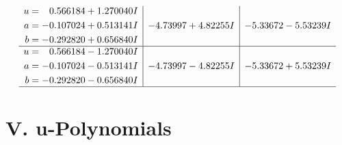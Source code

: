 \documentclass[1p]{elsarticle_modified}
\theoremstyle{definition}
\begin{document}
$$\begin{array}{c|c|c}
\begin{aligned}
u &= \phantom{-}0.566184 + 1.270040 I \\
a &= -0.107024 + 0.513141 I \\
b &= -0.292820 + 0.656840 I\end{aligned}
 & -4.73997 + 4.82255 I & -5.33672 - 5.53239 I \\ \hline\begin{aligned}
u &= \phantom{-}0.566184 - 1.270040 I \\
a &= -0.107024 - 0.513141 I \\
b &= -0.292820 - 0.656840 I\end{aligned}
 & -4.73997 - 4.82255 I & -5.33672 + 5.53239 I\\
 \hline 
 \end{array}$$\newpage
\newpage\renewcommand{\arraystretch}{1}
\centering \section*{ V. u-Polynomials}
\end{document}
